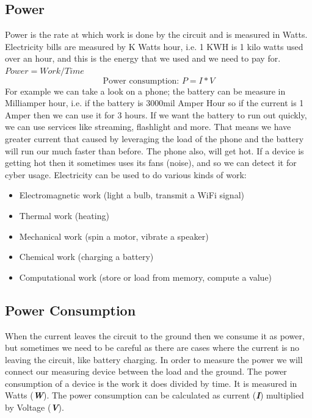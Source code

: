 \subsection{Power}
Power is the rate at which work is done by the circuit and is measured in Watts. Electricity bills are measured by K Watts hour, i.e. 1 KWH is 1 kilo watts used over an hour, and this is the energy that we used and we need to pay for.
$Power = Work / Time$
\newline
\begin{displaymath}\label{eq:power_consumption}
    \textrm{Power consumption: } P=I*V
\end{displaymath}
For example we can take a look on a phone; the battery can be measure in Milliamper hour, i.e. if the battery is 3000mil Amper Hour so if the current is 1 Amper then we can use it for 3 hours. If we want the battery to run out quickly, we can use services like streaming, flashlight and more. That means we have greater current that caused by leveraging the load of the phone and the battery will run our much faster than before. The phone also, will get hot. If a device is getting hot then it sometimes uses its fans (noise), and so we can detect it for cyber usage.
\newline
Electricity can be used to do various kinds of work:
\begin{itemize}
    \item Electromagnetic work (light a bulb, transmit a WiFi signal)
    \item Thermal work (heating)
    \item Mechanical work (spin a motor, vibrate a speaker)
    \item Chemical work (charging a battery)
    \item Computational work (store or load from memory, compute a value)
\end{itemize}
\subsection{Power Consumption}
When the current leaves the circuit to the ground then we consume it as power, but sometimes we need to be careful as there are cases where the current is no leaving the circuit, like battery charging. In order to measure the power we will connect our measuring device between the load and the ground.
The power consumption of a device is the work it does divided by time. It is measured in Watts (\textbf{\textit{W}}).
The power consumption can be calculated as current (\textbf{\textit{I}}) multiplied by Voltage (\textbf{\textit{V}}).
